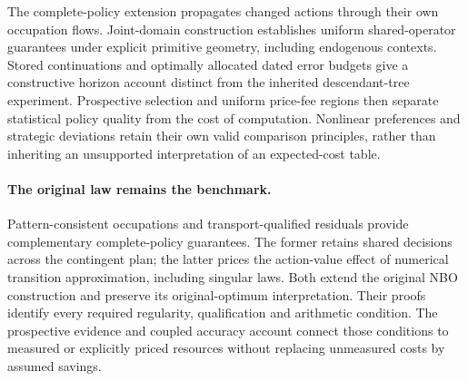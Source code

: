 \documentclass[ecta,nameyear,draft]{econsocart}
\begin{document}
The complete-policy extension propagates changed actions through their own occupation flows. Joint-domain construction establishes uniform shared-operator guarantees under explicit primitive geometry, including endogenous contexts. Stored continuations and optimally allocated dated error budgets give a constructive horizon account distinct from the inherited descendant-tree experiment. Prospective selection and uniform price-fee regions then separate statistical policy quality from the cost of computation. Nonlinear preferences and strategic deviations retain their own valid comparison principles, rather than inheriting an unsupported interpretation of an expected-cost table.


\paragraph{The original law remains the benchmark.}
Pattern-consistent occupations and transport-qualified residuals provide complementary complete-policy guarantees. The former retains shared decisions across the contingent plan; the latter prices the action-value effect of numerical transition approximation, including singular laws. Both extend the original NBO construction and preserve its original-optimum interpretation. Their proofs identify every required regularity, qualification and arithmetic condition. The prospective evidence and coupled accuracy account connect those conditions to measured or explicitly priced resources without replacing unmeasured costs by assumed savings.



\end{document}

